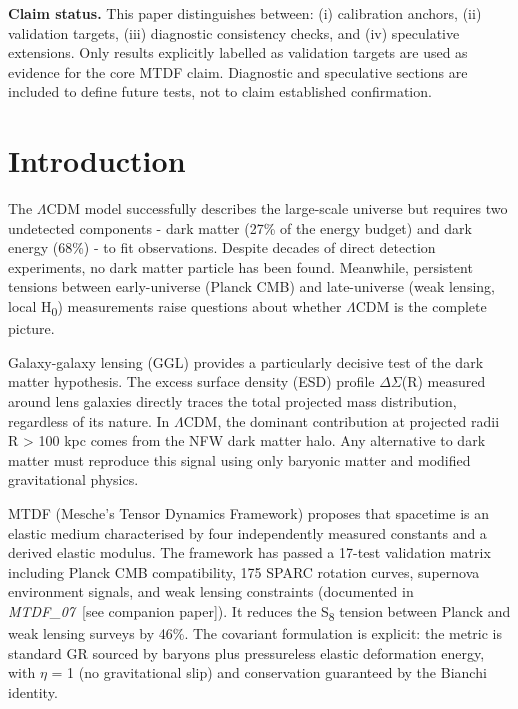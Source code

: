 \documentclass[11pt,a4paper]{article}
\begin{document}
\begin{mdframed}[linecolor=accent,linewidth=0.5pt,backgroundcolor=callout-bg,leftline=true,rightline=true,topline=true,bottomline=true,innerleftmargin=8pt,innerrightmargin=8pt,innertopmargin=6pt,innerbottommargin=6pt]
\textbf{Claim status.}
This paper distinguishes between:
(i) calibration anchors,
(ii) validation targets,
(iii) diagnostic consistency checks, and
(iv) speculative extensions.
Only results explicitly labelled as validation targets are used as evidence for the core MTDF claim. Diagnostic and speculative sections are included to define future tests, not to claim established confirmation.
\end{mdframed}

\section{Introduction}
\label{sec:intro}
The $\Lambda$CDM model successfully describes the large-scale universe but requires two undetected components  -  dark matter (27\% of the energy budget) and dark energy (68\%)  -  to fit observations. Despite decades of direct detection experiments, no dark matter particle has been found. Meanwhile, persistent tensions between early-universe (Planck CMB) and late-universe (weak lensing, local H\textsubscript{0}) measurements raise questions about whether $\Lambda$CDM is the complete picture.

Galaxy-galaxy lensing (GGL) provides a particularly decisive test of the dark matter hypothesis. The excess surface density (ESD) profile $\Delta$$\Sigma$(R) measured around lens galaxies directly traces the total projected mass distribution, regardless of its nature. In $\Lambda$CDM, the dominant contribution at projected radii R > 100 kpc comes from the NFW dark matter halo. Any alternative to dark matter must reproduce this signal using only baryonic matter and modified gravitational physics.

MTDF (Mesche's Tensor Dynamics Framework) proposes that spacetime is an elastic medium characterised by four independently measured constants and a derived elastic modulus. The framework has passed a 17-test validation matrix including Planck CMB compatibility, 175 SPARC rotation curves, supernova environment signals, and weak lensing constraints (documented in \textit{MTDF\_\allowbreak{}07}~[see companion paper]). It reduces the S\textsubscript{8} tension between Planck and weak lensing surveys by 46\%. The covariant formulation is explicit: the metric is standard GR sourced by baryons plus pressureless elastic deformation energy, with $\eta$ = 1 (no gravitational slip) and conservation guaranteed by the Bianchi identity.
\end{document}
